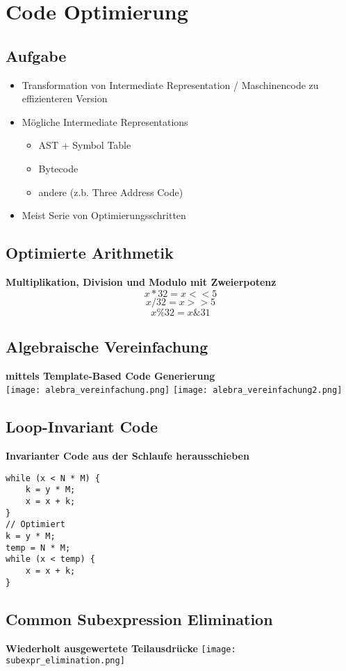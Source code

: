 \section{Code Optimierung}
\subsection{Aufgabe}
\begin{itemize}
    \item Transformation von Intermediate Representation / Maschinencode zu effizienteren Version 
    \item Mögliche Intermediate Representations
    \begin{itemize}
        \item AST + Symbol Table
        \item Bytecode
        \item andere (z.b. Three Address Code)
    \end{itemize}
    \item Meist Serie von Optimierungsschritten
\end{itemize}

\subsection{Optimierte Arithmetik}
\textbf{Multiplikation, Division und Modulo mit Zweierpotenz}\\ 
\[ x * 32 = x << 5\] 
\[ x / 32 = x >> 5\] 
\[ x \% 32 = x \& 31\] 

\subsection{Algebraische Vereinfachung}
\textbf{mittels Template-Based Code Generierung}\\
\texttt{[image: alebra\_vereinfachung.png]}
\texttt{[image: alebra\_vereinfachung2.png]}

\subsection{Loop-Invariant Code}
\textbf{Invarianter Code aus der Schlaufe herausschieben}
\begin{lstlisting}
while (x < N * M) {
    k = y * M;
    x = x + k;
}
// Optimiert
k = y * M;
temp = N * M;
while (x < temp) {
    x = x + k;
}
\end{lstlisting}
\subsection{Common Subexpression Elimination}
\textbf{Wiederholt ausgewertete Teilausdrücke}
\texttt{[image: subexpr\_elimination.png]}

